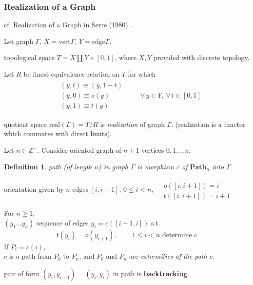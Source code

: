 \documentclass[10pt]{amsart}
\newtheorem{definition}{Definition}
\begin{document}
\begin{multicols*}{2}
\subsubsection{Realization of a Graph}

cf. Realization of a Graph in Serre (1980) \cite{Serr1980}.  

Let graph $\Gamma$, $X = \text{vert}\Gamma$, $Y = \text{edge}\Gamma$.

topological space $T = X \coprod Y \times [0,1]$, where $X,Y$ provided with discrete topology.  

Let $R$ be finest equivalence relation on $T$ for which 
\begin{equation}
\begin{gathered} \begin{aligned}
	& (y,t) \equiv (\overline{y}, 1-t) \\ 
	& (y,0) \equiv o(y) \\
	& (y,1) \equiv t(y)
\end{aligned} \qquad \, \forall \, y \in Y, \, \forall \, t \in [0,1]
\end{gathered}
\end{equation}

quotient space $\text{real}(\Gamma) = T/R $ is \emph{realization} of graph $\Gamma$.  (realization is a functor which commutes with direct limits).  

Let $n\in \mathbb{Z}^+$.  Consider oriented graph of $n+1$ vertices $0,1,\dots n$,  \\

\begin{definition}
	path (of length $n$) in graph $\Gamma$ is morphism $c$ of $\mathbf{\text{Path}}_n$ into $\Gamma$  
\end{definition}

orientation given by $n$ edges $[i,i+1]$, $0\leq i <n$, $\begin{aligned} & \quad \\
& o([i,i+1]) = i \\
& t([i,i+1]) = i+1 \end{aligned}$  

For $n\geq 1$, \\
$(y_1\dots y_n)$ sequence of edges $y_i = c([i-1,i])$ s.t. 
\[
t(y_i) = o(y_{i+1}), \qquad \, 1 \leq i < n \text{ determine } c
\]
If $P_i = c(i)$,  \\
$c$ is a path from $P_0$ to $P_n$, and $P_0$ and $P_n$ are \emph{extremities of the path $c$}.  

pair of form $(y_i,y_{i+1})=(y_i, \overline{y}_i)$ in path is \textbf{backtracking}.  


\end{multicols*}
\end{document}
